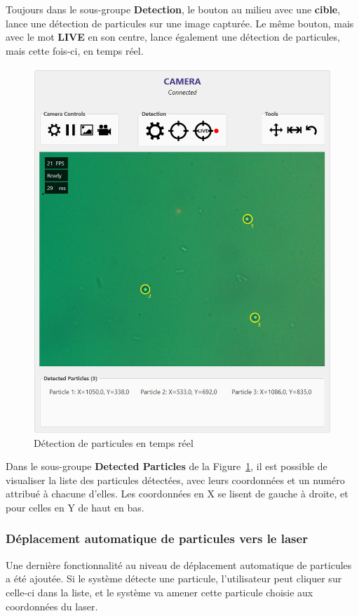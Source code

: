 Toujours dans le sous-groupe \textbf{Detection}, le bouton au milieu avec une \textbf{cible}, lance une détection de particules sur une image capturée. Le même bouton, mais avec le mot \textbf{LIVE} en son centre, lance également une détection de particules, mais cette fois-ci, en temps réel.
\newpage
\begin{figure}[H]
    \centering
    \includegraphics[width=\textwidth]{assets/figures/Application_ServoVision/Live_Targeting_Bead.png}
    \caption{Détection de particules en temps réel}
    \label{Live_Targeting_Bead}
\end{figure}

Dans le sous-groupe \textbf{Detected Particles} de la Figure~\ref{Live_Targeting_Bead}, il est possible de visualiser la liste des particules détectées, avec leurs coordonnées et un numéro attribué à chacune d'elles. Les coordonnées en X se lisent de gauche à droite, et pour celles en Y de haut en bas.

\newpage
\subsubsection{Déplacement automatique de particules vers le laser}
Une dernière fonctionnalité au niveau de déplacement automatique de particules a été ajoutée. Si le système détecte une particule, l'utilisateur peut cliquer sur celle-ci dans la liste, et le système va amener cette particule choisie aux coordonnées du laser.

